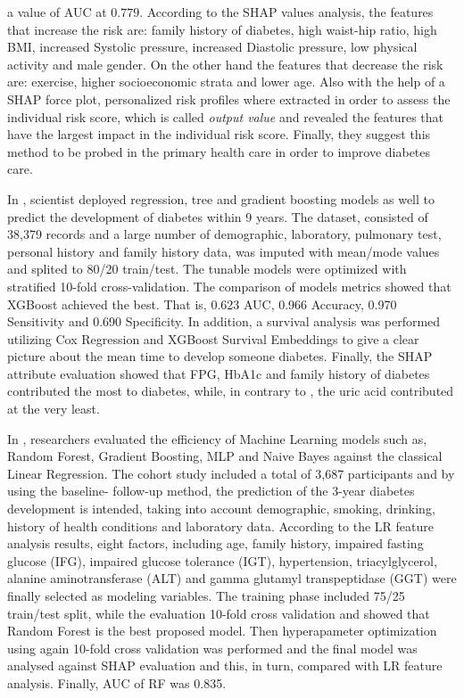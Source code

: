 \documentclass[journal,article,submit,pdftex,moreauthors]{Definitions/mdpi}
\begin{document}
a value of AUC at $0.779$. According to the SHAP values analysis, the features that increase
the risk are: family history of diabetes, high waist-hip  ratio, high BMI, increased Systolic
pressure, increased Diastolic pressure, low physical activity and male gender. On the other
hand the features that decrease the risk are: exercise, higher socioeconomic strata and lower
age. Also with the help of a SHAP force plot, personalized risk profiles where extracted in order
to assess the individual risk score, which is called \textit{output value} and  revealed 
the features that have the largest impact in the individual risk score. Finally, they suggest 
this method to be probed in the primary health care in order to improve diabetes care.
\par In \cite{Shin}, scientist deployed regression, tree  and gradient boosting models as well to predict the development of diabetes
within 9 years. The dataset, consisted of 38,379 records and a large number of demographic, laboratory, pulmonary test, personal 
history and family history data, was imputed with mean/mode values and splited to 80/20 train/test. The tunable models were optimized
with stratified 10-fold cross-validation. The comparison of models metrics showed that  XGBoost achieved the best. That is, 0.623 AUC,
0.966 Accuracy, 0.970 Sensitivity and 0.690 Specificity. In addition, a survival analysis was performed utilizing Cox Regression
and XGBoost Survival Embeddings to give a clear picture about the mean time to develop someone diabetes. Finally, the SHAP attribute
evaluation showed that FPG, HbA1c and family history of diabetes contributed the most to diabetes, while, in contrary to \cite{zhang},
the uric acid contributed at the very least.

\par In \cite{Mao}, researchers evaluated  the efficiency of Machine Learning models such as, Random Forest, Gradient Boosting, MLP and
Naive Bayes against the classical Linear Regression. The cohort study included a total of 3,687 participants and by using the baseline- 
follow-up method, the prediction of the 3-year diabetes development is intended, taking into account demographic, smoking, drinking, 
history of health conditions and laboratory data. According to the LR feature analysis  results,
eight factors, including age, family history, impaired fasting glucose (IFG), impaired glucose tolerance (IGT), hypertension, triacylglycerol,
alanine aminotransferase (ALT) and gamma glutamyl transpeptidase (GGT) were finally selected as modeling variables. The training phase
included 75/25 train/test split, while the evaluation 10-fold cross validation and showed that Random Forest is the best proposed model.
Then hyperapameter optimization using again 10-fold cross validation was performed and the final model was analysed against SHAP 
evaluation and this, in turn, compared with LR feature analysis. Finally, AUC of RF was 0.835. 
\end{document}
